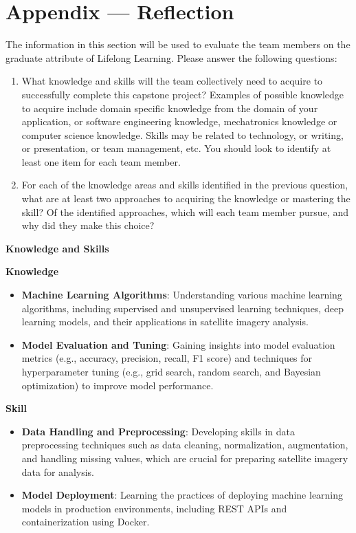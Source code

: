 \documentclass[12pt]{article}
\begin{document}
\newpage{}
\section*{Appendix --- Reflection}

The information in this section will be used to evaluate the team members on the
graduate attribute of Lifelong Learning.  Please answer the following questions:

\begin{enumerate}
  \item What knowledge and skills will the team collectively need to acquire to
  successfully complete this capstone project?  Examples of possible knowledge
  to acquire include domain specific knowledge from the domain of your
  application, or software engineering knowledge, mechatronics knowledge or
  computer science knowledge.  Skills may be related to technology, or writing,
  or presentation, or team management, etc.  You should look to identify at
  least one item for each team member.
  \item For each of the knowledge areas and skills identified in the previous
  question, what are at least two approaches to acquiring the knowledge or
  mastering the skill?  Of the identified approaches, which will each team
  member pursue, and why did they make this choice?
\end{enumerate}

\textbf{Knowledge and Skills}

\textbf{Knowledge}
\begin{itemize}
    \item \textbf{Machine Learning Algorithms}: Understanding various machine learning algorithms, including supervised and unsupervised learning techniques, deep learning models, and their applications in satellite imagery analysis.
    \item \textbf{Model Evaluation and Tuning}: Gaining insights into model evaluation metrics (e.g., accuracy, precision, recall, F1 score) and techniques for hyperparameter tuning (e.g., grid search, random search, and Bayesian optimization) to improve model performance.
\end{itemize}

\textbf{Skill}
\begin{itemize}
    \item \textbf{Data Handling and Preprocessing}: Developing skills in data preprocessing techniques such as data cleaning, normalization, augmentation, and handling missing values, which are crucial for preparing satellite imagery data for analysis.
    \item \textbf{Model Deployment}: Learning the practices of deploying machine learning models in production environments, including REST APIs and containerization using Docker.
\end{itemize}
\end{document}
